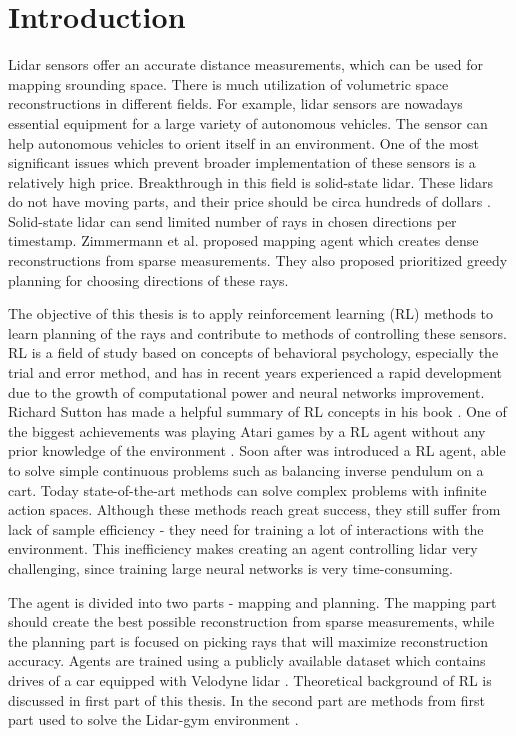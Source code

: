 \section{Introduction}

Lidar sensors offer an accurate distance measurements, which can be used for mapping srounding space. There is much utilization of volumetric space reconstructions in different fields. For example, lidar sensors are nowadays essential equipment for a large variety of autonomous vehicles. The sensor can help autonomous vehicles to orient itself in an environment. One of the most significant issues which prevent broader implementation of these sensors is a relatively high price. Breakthrough in this field is solid-state lidar. These lidars do not have moving parts, and their price should be circa hundreds of dollars \cite{quanergy2016}. Solid-state lidar can send limited number of rays in chosen directions per timestamp. Zimmermann et al. \cite{zimmermann2017} proposed mapping agent which creates dense reconstructions from sparse measurements. They also proposed prioritized greedy planning for choosing directions of these rays. \par The objective of this thesis is to apply reinforcement learning (RL) methods to learn planning of the rays and contribute to methods of controlling these sensors. RL is a field of study based on concepts of behavioral psychology, especially the trial and error method, and has in recent years experienced a rapid development due to the growth of computational power and neural networks improvement. Richard Sutton has made a helpful summary of RL concepts in his book \cite{sutton2012}. One of the biggest achievements was playing Atari games by a RL agent without any prior knowledge of the environment \cite{mnih2015}. Soon after was introduced a RL agent, able to solve simple continuous problems such as balancing inverse pendulum on a cart. Today state-of-the-art methods can solve complex problems with infinite action spaces. Although these methods reach great success, they still suffer from lack of sample efficiency - they need for training a lot of interactions with the environment. This inefficiency makes creating an agent controlling lidar very challenging, since training large neural networks is very time-consuming. \par The agent is divided into two parts - mapping and planning. The mapping part should create the best possible reconstruction from sparse measurements, while the planning part is focused on picking rays that will maximize reconstruction accuracy. Agents are trained using a publicly available dataset which contains drives of a car equipped with Velodyne lidar \cite{geiger2013}. Theoretical background of RL is discussed in first part of this thesis. In the second part are methods from first part used to solve the Lidar-gym environment \cite{rozsypalek2018}.
  